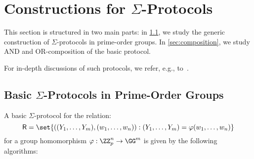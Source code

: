 \documentclass[runningheads]{llncs}
\begin{document}
\section{Constructions for $\Sigma$-Protocols}

This section is structured in two main parts: in \cref{sec:basicsigma}, we study the generic construction of $\Sigma$-protocols in prime-order groups. In \cref{sec:composition}, we study AND and OR-composition of the basic protocol.

For in-depth discussions of such protocols, we refer, e.g., to~\cite{bangerter05,AFRICACRYPT:Maurer09,DBLP:journals/dcc/Maurer15}.
\subsection{Basic $\Sigma$-Protocols in Prime-Order Groups}\label{sec:basicsigma}
A basic $\Sigma$-protocol for the relation:
\[
  \relation=\set{((\statement_1,\dots,\statement_m),(w_1,\dots,w_n)) : (\statement_1,\dots,\statement_m)=\varphi(w_1,\dots,w_n)}
\]
 for a group homomorphism $\varphi:\ZZ_p^n\to\GG^m$ is given by the following algorithms:
\end{document}
